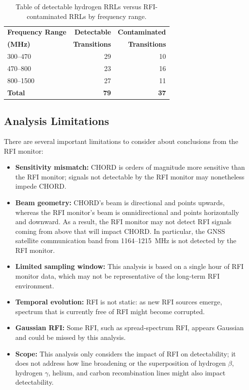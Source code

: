 \begin{table}
\centering
\caption[Detectable lines by frequency range]{Table of detectable hydrogen RRLs versus RFI-contaminated RRLs by frequency range.}
\label{tbl:RFI_lines}

\begin{tabular}{lrr}
\hline
\textbf{Frequency Range} & \textbf{Detectable} & \textbf{Contaminated} \\
\textbf{(MHz)} & \textbf{Transitions} & \textbf{Transitions} \\
\hline
300--470     & 29 & 10 \\
470--800    & 23 & 16  \\
800--1500   & 27 & 11  \\
\hline
\textbf{Total} & \textbf{79} & \textbf{37} \\
\hline
\end{tabular}
\end{table}

\subsection{Analysis Limitations}
There are several important limitations to consider about conclusions from the RFI monitor:
\begin{itemize}
    \item \textbf{Sensitivity mismatch:} CHORD is orders of magnitude more sensitive than the RFI monitor; signals not detectable by the RFI monitor may nonetheless impede CHORD.
    \item \textbf{Beam geometry:} CHORD's beam is directional and points upwards, whereas the RFI monitor's beam is omnidirectional and points horizontally and downward. As a result, the RFI monitor may not detect RFI signals coming from above that will impact CHORD. In particular, the GNSS satellite communication band from \mbox{1164--1215}~MHz is not detected by the RFI monitor.
    \item \textbf{Limited sampling window:} This analysis is based on a single hour of RFI monitor data, which may not be representative of the long-term RFI environment.
    \item \textbf{Temporal evolution:} RFI is not static: as new RFI sources emerge, spectrum that is currently free of RFI might become corrupted.
    \item \textbf{Gaussian RFI:} Some RFI, such as spread-spectrum RFI, appears Gaussian and could be missed by this analysis.
    \item \textbf{Scope:} This analysis only considers the impact of RFI on detectability; it does not address how line broadening or the superposition of hydrogen $\beta$, hydrogen $\gamma$, helium, and carbon recombination lines might also impact detectability.
\end{itemize}